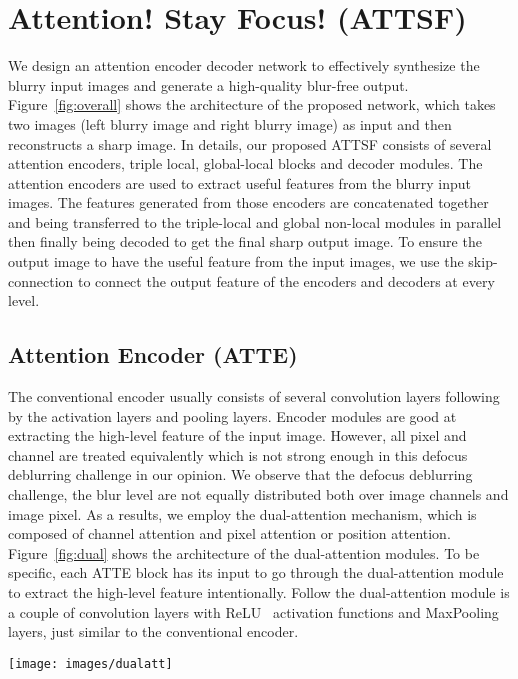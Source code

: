 \documentclass[final]{cvpr}
\begin{document}
\section{Attention! Stay Focus! (ATTSF)}
We design an attention encoder decoder network to effectively synthesize the blurry input images and generate a high-quality blur-free output. Figure~\ref{fig:overall} shows the architecture of the proposed network, which takes two images (left blurry image and right blurry image) as input and then reconstructs a sharp image. In details,  our proposed ATTSF consists of several attention encoders, triple local, global-local blocks and decoder modules. The attention encoders are used to extract useful features from the blurry input images. The features generated from those encoders are concatenated together and being transferred to the triple-local and global non-local modules in parallel then finally being decoded to get the final sharp output image. To ensure the output image to have the useful feature from the input images, we use the skip-connection to connect the output feature of the encoders and decoders at every level.

\subsection{Attention Encoder (ATTE)}

The conventional encoder usually consists of several convolution layers following by the activation layers and pooling layers. Encoder modules are good at extracting the high-level feature of the input image. However, all pixel and channel are treated equivalently which is not strong enough in this defocus deblurring challenge in our opinion. We observe that the defocus deblurring challenge, the blur level are not equally distributed both over image channels and image pixel. As a results, we employ the dual-attention mechanism, which is composed of channel attention and pixel attention or position attention. Figure~\ref{fig:dual} shows the architecture of the dual-attention modules. To be specific, each ATTE block has its input to go through the dual-attention module to extract the high-level feature intentionally. Follow the dual-attention module is a couple of convolution layers with ReLU~\cite{relu} activation functions and MaxPooling layers, just similar to the conventional encoder.

\begin{figure*}
\begin{center}
\texttt{[image: images/dualatt]}
\end{center}
   \caption{Dual Attention Module. GAP, GMP are Global Average Pooling and Global Max Pooling, respectively. $\times$ denotes channel-wise multiplication, and $C$ denotes the concatenate operation.}
\label{fig:dual}
\end{figure*}
\end{document}
